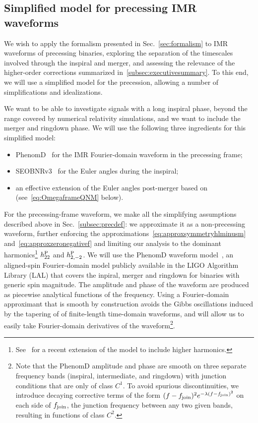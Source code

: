 \documentclass[aps,showpacs,twocolumn,
prd,superscriptaddress,nofootinbib]{revtex4-1}
\begin{document}
\subsection{Simplified model for precessing IMR waveforms}
\label{subsec:precmodel}

We wish to apply the formalism presented in Sec.~\ref{sec:formalism} to IMR waveforms of precessing binaries, exploring the separation of the timescales involved through the inspiral and merger, and assessing the relevance of the higher-order corrections summarized in~\ref{subsec:executivesummary}. To this end, we will use a simplified model for the precession, allowing a number of simplifications and idealizations.

We want to be able to investigate signals with a long inspiral phase, beyond the range covered by numerical relativity simulations, and we want to include the merger and ringdown phase. We will use the following three ingredients for this simplified model:
\begin{itemize}
	\item PhenomD~\cite{Husa+15, Khan+15} for the IMR Fourier-domain waveform in the precessing frame;
	\item SEOBNRv3~\cite{Pan+13, BTB16} for the Euler angles during the inspiral;
	\item an effective extension of the Euler angles post-merger based on~\cite{OShaughnessy+12} (see~\eqref{eq:OmegaframeQNM} below).
\end{itemize}

For the precessing-frame waveform, we make all the simplifying assumptions described above in Sec.~\ref{subsec:precdef}: we approximate it as a non-precessing waveform, further enforcing the approximations~\eqref{eq:approxsymmetryhlminusm} and~\eqref{eq:approxzeronegativef} and limiting our analysis to the dominant harmonics\footnote{See~\cite{London+17} for a recent extension of the model to include higher harmonics.} $h^{\rm P}_{22}$ and $h^{\rm P}_{2,-2}$. We will use the PhenomD waveform model~\cite{Husa+15, Khan+15}, an aligned-spin Fourier-domain model publicly available in the LIGO Algorithm Library (LAL) that covers the inpiral, merger and ringdown for binaries with generic spin magnitude. The amplitude and phase of the waveform are produced as piecewise analytical functions of the frequency. Using a Fourier-domain approximant that is smooth by construction avoids the Gibbs oscillations induced by the tapering of of finite-length time-domain waveforms, and will allow us to easily take Fourier-domain derivatives of the waveform\footnote{Note that the PhenomD amplitude and phase are smooth on three separate frequency bands (inspiral, intermediate, and ringdown) with junction conditions that are only of class $C^{1}$. To avoid spurious discontinuities, we introduce decaying corrective terms of the form $(f-f_{\rm join})^{2} e^{-\lambda(f-f_{\rm join})^{2}}$ on each side of $f_{\rm join}$, the junction frequency between any two given bands, resulting in functions of class $C^{2}$.}.
\end{document}
